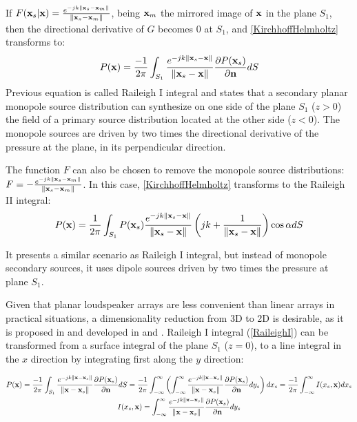 If $F(\PosTheo[surface] \vert \PosTheo) = \GreenFunc[ {\PosTheo[surface] - \PosTheo[mirrored]} ]$, being $\PosTheo[mirrored]$ the mirrored image of $\PosTheo$ in the plane $S_1$, then the directional derivative of $G$ becomes $0$ at $S_1$, and \autoref{KirchhoffHelmholtz} transforms to:
\begin{equation}
P(\PosTheo) = \frac{-1}{2\pi} \int_{S_1} \GreenFunc[{\PosTheo[surface] - \PosTheo}] \frac{\partial P(\PosTheo[surface])}{\partial \mathbf{n}} dS
\label{RaileighI}
\end{equation}
Previous equation is called Raileigh I integral and states that a secondary planar monopole source distribution can synthesize on one side of the plane $S_1$ ($z>0$) the field of a primary source distribution located at the other side ($z<0$). The monopole sources are driven by two times the directional derivative of the pressure at the plane, in its perpendicular direction.

The function $F$ can also be chosen to remove the monopole source distributions: $F = -\GreenFunc[ {\PosTheo[surface] - \PosTheo[mirrored]} ]$. In this case, \autoref{KirchhoffHelmholtz} transforms to the Raileigh II integral:
\begin{equation}
P(\PosTheo) = \frac{1}{2\pi} \int_{S_1} P(\PosTheo[surface]) \GreenFunc[{\PosTheo[surface] - \PosTheo}] \left(jk + \frac{1}{\norm{\PosTheo[surface] - \PosTheo}}\right)\cos\normSecondPropAngle dS
\end{equation}

It presents a similar scenario as Raileigh I integral, but instead of monopole secondary sources, it uses dipole sources driven by two times the pressure at plane $S_1$.

Given that planar loudspeaker arrays are less convenient than linear arrays in practical situations, a dimensionality reduction from 3D to 2D is desirable, as it is proposed in \cite{Vogel} and developed in \cite{Start1997} and  \cite{Verheijen}.
Raileigh I integral (\autoref{RaileighI}) can be transformed from a surface integral of the plane $S_1$ ($z=0$), to a line integral in the $x$ direction by integrating first along the $y$ direction:

\begin{gather}
P(\PosTheo) = \frac{-1}{2\pi} \int_{S_1} \GreenFunc[{\PosTheo - \PosTheo[surface]}] \frac{\partial P(\PosTheo[surface])}{\partial \mathbf{n}} dS = \frac{-1}{2\pi} \int_{-\infty}^{\infty} \left( \int_{-\infty}^{\infty} \GreenFunc[{\PosTheo - \PosTheo[surface]}] \frac{\partial P(\PosTheo[surface])}{\partial \mathbf{n}} dy_s \right) dx_s = \frac{-1}{2\pi} \int_{-\infty}^{\infty} I(x_s, \PosTheo) dx_s \\
I(x_s, \PosTheo) = \int_{-\infty}^{\infty} \GreenFunc[{\PosTheo - \PosTheo[surface]}] \frac{\partial P(\PosTheo[surface])}{\partial \mathbf{n}} dy_s
\label{LineIntegral}
\end{gather}


